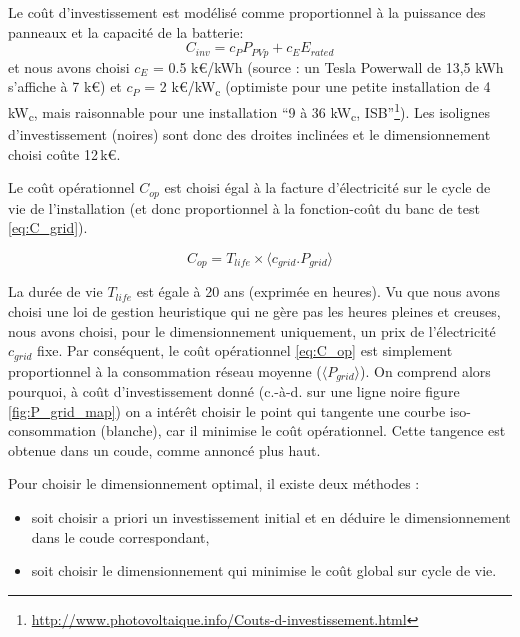 \documentclass[a4paper,10pt,twocolumn]{article}
\providecommand{\avg}[1]{\langle#1\rangle}
\newcommand\sub[1]{\textsubscript{#1}}
\newcommand\kWc{kW\sub{c}{}}
\begin{document}
Le coût d'investissement est modélisé comme proportionnel à la puissance
des panneaux et la capacité de la batterie:
%
\begin{equation} \label{eq:C_inv}
  C_{inv} = c_P P_{PVp} + c_E E_{rated}
\end{equation} 
et nous avons choisi $c_E$ = 0.5 k€/kWh (source : un Tesla Powerwall de 13,5 kWh s'affiche à 7 k€)
et $c_P$ = 2 k€/\kWc{} (optimiste pour une petite installation de 4\,\kWc,
mais raisonnable pour une installation ``9 à 36 \kWc, ISB''\footnote{\url{http://www.photovoltaique.info/Couts-d-investissement.html}}).
Les isolignes d'investissement (noires) sont donc des droites inclinées
et le dimensionnement choisi coûte 12\,k€.

Le coût opérationnel $C_{op}$ est choisi égal à la facture d'électricité
sur le cycle de vie de l'installation (et donc proportionnel à la fonction-coût
du banc de test \eqref{eq:C_grid}).

\begin{equation} \label{eq:C_op}
  C_{op} = T_{life} \times \avg{c_{grid}.P_{grid} }
\end{equation} 

La durée de vie $T_{life}$ est égale à 20 ans (exprimée en heures).
Vu que nous avons choisi une loi de gestion heuristique qui ne gère pas les heures pleines et creuses,
nous avons choisi, pour le dimensionnement uniquement, un prix de l'électricité $c_{grid}$ fixe.
Par conséquent, le coût opérationnel \eqref{eq:C_op} est simplement proportionnel à
la consommation réseau moyenne ($\avg{P_{grid}}$).
On comprend alors pourquoi, à coût d'investissement donné (c.-à-d. sur une ligne noire figure \ref{fig:P_grid_map})
on a intérêt choisir le point qui tangente une courbe iso-consommation (blanche),
car il minimise le coût opérationnel. Cette tangence est obtenue dans un coude, comme annoncé plus haut.

Pour choisir le dimensionnement optimal, il existe deux méthodes :

\begin{itemize}
 \item soit choisir a priori un investissement initial et en déduire le dimensionnement
 dans le coude correspondant,
 \item soit choisir le dimensionnement qui minimise le coût global sur cycle de vie.
\end{itemize}
\end{document}
